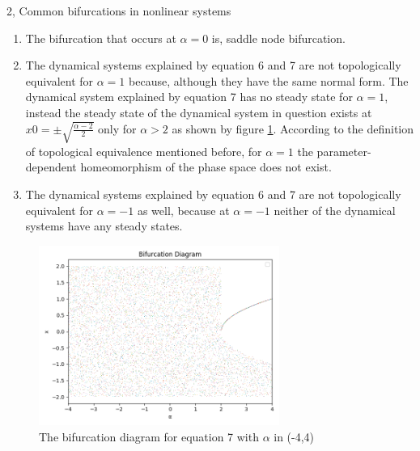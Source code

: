 \documentclass[10pt,a4paper]{article}
\begin{document}
\begin{task}{2, Common bifurcations in nonlinear systems}
	\begin{enumerate}
		\item The bifurcation that occurs at $\alpha=0$ is, saddle node bifurcation.
		\item The dynamical systems explained by equation 6 and 7 are not topologically equivalent for $\alpha=1$ because, although they have the same normal form. The dynamical system explained by equation 7 has no steady state for $\alpha=1$, instead the steady state of the dynamical system in question exists at $x0 = \pm \sqrt{\frac{\alpha -2}{2}}$ only for $\alpha > 2$ as shown by figure \ref{fig:task2_3_bifurcation}. According to the definition of topological equivalence mentioned before, for $\alpha=1$ the parameter-dependent homeomorphism of the phase space does not exist.
		\item The dynamical systems explained by equation 6 and 7 are not topologically equivalent for $\alpha=-1$ as well, because at $\alpha=-1$ neither of the dynamical systems have any steady states.
	\end{enumerate}	        
    
    \begin{figure}[H]
        \centering
        \includegraphics[width=0.7\textwidth]{../plots/task2_3.png}
        \caption{The bifurcation diagram for equation 7 with $\alpha$ in (-4,4)}
        \label{fig:task2_3_bifurcation}
    \end{figure}
\end{task}
\end{document}

